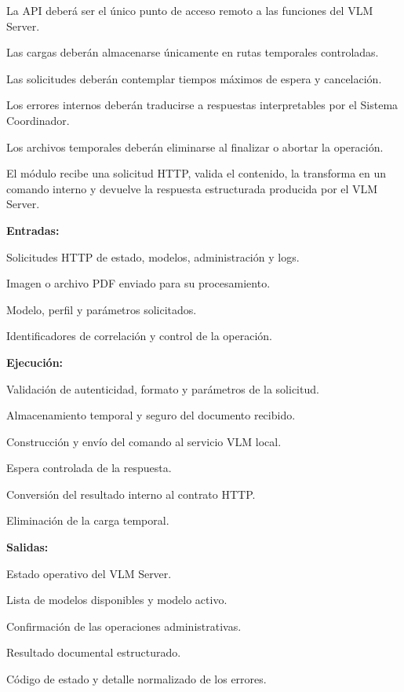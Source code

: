 \begin{definicionmodulo}
\item[Restricciones]
\begin{elementosmodulo}
    \item La API deberá ser el único punto de acceso remoto a las funciones del VLM Server.
    \item Las cargas deberán almacenarse únicamente en rutas temporales controladas.
    \item Las solicitudes deberán contemplar tiempos máximos de espera y cancelación.
    \item Los errores internos deberán traducirse a respuestas interpretables por el Sistema Coordinador.
    \item Los archivos temporales deberán eliminarse al finalizar o abortar la operación.
\end{elementosmodulo}

\item[Estructura general] El módulo recibe una solicitud HTTP, valida el contenido, la transforma en un comando interno y devuelve la respuesta estructurada producida por el VLM Server.

\textbf{Entradas:}
\begin{elementosmodulo}
    \item Solicitudes HTTP de estado, modelos, administración y logs.
    \item Imagen o archivo PDF enviado para su procesamiento.
    \item Modelo, perfil y parámetros solicitados.
    \item Identificadores de correlación y control de la operación.
\end{elementosmodulo}

\textbf{Ejecución:}
\begin{elementosmodulo}
    \item Validación de autenticidad, formato y parámetros de la solicitud.
    \item Almacenamiento temporal y seguro del documento recibido.
    \item Construcción y envío del comando al servicio VLM local.
    \item Espera controlada de la respuesta.
    \item Conversión del resultado interno al contrato HTTP.
    \item Eliminación de la carga temporal.
\end{elementosmodulo}

\textbf{Salidas:}
\begin{elementosmodulo}
    \item Estado operativo del VLM Server.
    \item Lista de modelos disponibles y modelo activo.
    \item Confirmación de las operaciones administrativas.
    \item Resultado documental estructurado.
    \item Código de estado y detalle normalizado de los errores.
\end{elementosmodulo}

\end{definicionmodulo}


